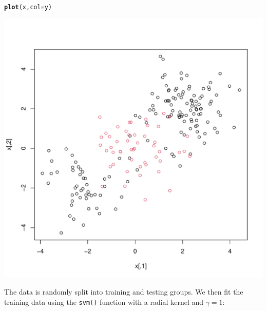 \documentclass[12pt]{article}\usepackage[]{graphicx}\usepackage[]{color}
\makeatletter
\def\maxwidth{ %
  \ifdim\Gin@nat@width>\linewidth
    \linewidth
  \else
    \Gin@nat@width
  \fi
}
\newcommand{\hlstd}[1]{\textcolor[rgb]{0.345,0.345,0.345}{#1}}%
\newcommand{\hlkwc}[1]{\textcolor[rgb]{0.333,0.667,0.333}{#1}}%
\newcommand{\hlkwd}[1]{\textcolor[rgb]{0.737,0.353,0.396}{\textbf{#1}}}%
\newenvironment{kframe}{%
 \def\at@end@of@kframe{}%
 \ifinner\ifhmode%
  \def\at@end@of@kframe{\end{minipage}}%
  \begin{minipage}{\columnwidth}%
 \fi\fi%
 \def\FrameCommand##1{\hskip\@totalleftmargin \hskip-\fboxsep
 \colorbox{shadecolor}{##1}\hskip-\fboxsep
     \hskip-\linewidth \hskip-\@totalleftmargin \hskip\columnwidth}%
 \MakeFramed {\advance\hsize-\width
   \@totalleftmargin\z@ \linewidth\hsize
   \@setminipage}}%
 {\par\unskip\endMakeFramed%
 \at@end@of@kframe}
\newenvironment{knitrout}{}{} %
\makeatother
\begin{document}
\begin{knitrout}
\color{fgcolor}\begin{kframe}
\begin{alltt}
\hlkwd{plot}\hlstd{(x,} \hlkwc{col}\hlstd{=y)}
\end{alltt}
\end{kframe}
\includegraphics[width=\maxwidth]{figure/unnamed-chunk-18-1} 

\end{knitrout}

The data is randomly split into training and testing groups. We then fit the training data using the \texttt{svm()} function with a radial kernel and $\gamma = 1$:
\end{document}
